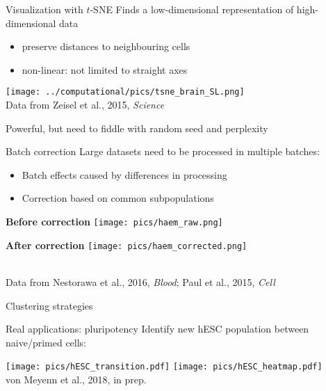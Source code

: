 \documentclass{beamer}
\begin{document}
\begin{frame}{Visualization with $t$-SNE}
Finds a low-dimensional representation of high-dimensional data 
\begin{itemize}
    \item preserve distances to neighbouring cells
    \item non-linear: not limited to straight axes
\end{itemize}
\begin{center}
    \texttt{[image: ../computational/pics/tsne\_brain\_SL.png]} \\
    {\tiny Data from Zeisel et al., 2015, \textit{Science}}
\end{center}
Powerful, but need to fiddle with random seed and perplexity
\end{frame}

\begin{frame}{Batch correction}
Large datasets need to be processed in multiple batches: 
\begin{itemize}
\item Batch effects caused by differences in processing
\item Correction based on common subpopulations
\end{itemize}
\vspace{0.1in}
\begin{minipage}{0.49\textwidth}
\begin{flushleft}
\textbf{Before correction}
\texttt{[image: pics/haem\_raw.png]} \\
\end{flushleft}
\end{minipage}
\begin{minipage}{0.49\textwidth}
\begin{flushleft}
\textbf{After correction}
\texttt{[image: pics/haem\_corrected.png]} \\
\end{flushleft}
\end{minipage}
\\[0.1in]
{\tiny Data from Nestorawa et al., 2016, \textit{Blood}; Paul et al., 2015, \textit{Cell}}
\end{frame}

\begin{frame}{Clustering strategies}

\end{frame}

\begin{frame}{Real applications: pluripotency}
Identify new hESC population between naive/primed cells:
\begin{center}
\texttt{[image: pics/hESC\_transition.pdf]}
\texttt{[image: pics/hESC\_heatmap.pdf]}\\
{\tiny von Meyenn et al., 2018, in prep.}
\end{center}
\end{frame}
\end{document}
